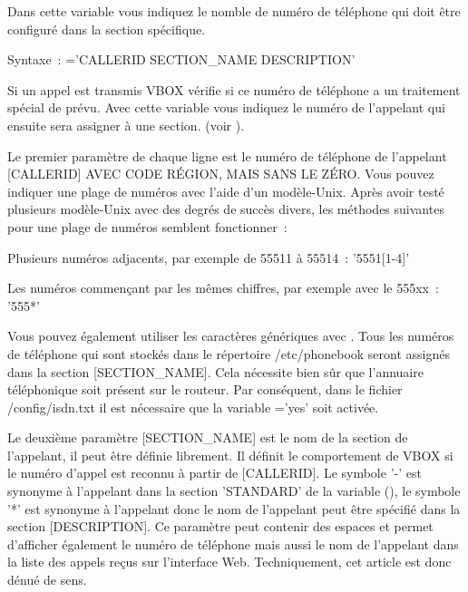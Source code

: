 \begin{description}


    Dans cette variable vous indiquez le nomble de numéro de téléphone qui doit être configuré
	dans la section spécifique.


    Syntaxe~: ='CALLERID SECTION\_NAME DESCRIPTION'

    Si un appel est transmis VBOX vérifie si ce numéro de téléphone a un traitement spécial de
	prévu. Avec cette variable vous indiquez le numéro de l'appelant qui ensuite sera assigner
	à une section. (voir ).

    Le premier paramètre de chaque ligne est le numéro de téléphone de l'appelant [CALLERID]
	AVEC CODE RÉGION, MAIS SANS LE ZÉRO. Vous pouvez indiquer une plage de numéros avec l'aide
	d'un modèle-Unix. Après avoir testé plusieurs modèle-Unix avec des degrés de succès divers,
	les méthodes suivantes pour une plage de numéros semblent fonctionner~:

    Plusieurs numéros adjacents, par exemple de 55511 à 55514~: '5551[1-4]'

    Les numéros commençant par les mêmes chiffres, par exemple avec le 555xx~: '555*'

    Vous pouvez également utiliser les caractères génériques avec . Tous
	les numéros de téléphone qui sont stockés dans le répertoire /etc/phonebook seront
	assignés dans la section [SECTION\_NAME]. Cela nécessite bien sûr que l'annuaire
	téléphonique soit présent sur le routeur. Par conséquent, dans le fichier /config/isdn.txt
	il est nécessaire que la variable ='yes' soit activée.

    Le deuxième paramètre [SECTION\_NAME] est le nom de la section de l'appelant, il peut
	être définie librement. Il définit le comportement de VBOX si le numéro d'appel est reconnu
	à partir de [CALLERID]. Le symbole '-' est synonyme à l'appelant dans la section 'STANDARD' de
	la variable (), le symbole '*' est synonyme à l'appelant
	donc le nom de l'appelant peut être spécifié dans la section [DESCRIPTION]. Ce paramètre peut
	contenir des espaces et permet d'afficher également le numéro de téléphone mais aussi le nom de
	l'appelant dans la liste des appels reçus sur l'interface Web. Techniquement, cet article est
	donc dénué de sens.


\end{description}

